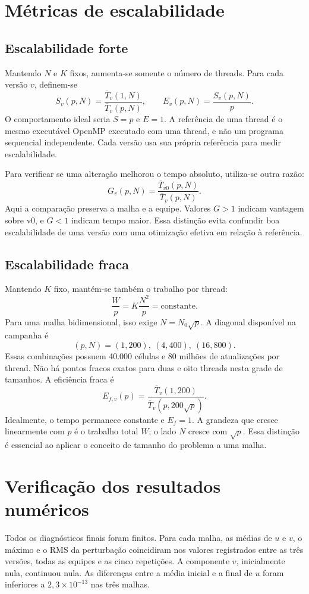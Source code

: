 \documentclass[12pt,a4paper]{article}
\begin{document}
\section{Métricas de escalabilidade}
\subsection{Escalabilidade forte}
Mantendo $N$ e $K$ fixos, aumenta-se somente o número de threads. Para cada versão $v$, definem-se
\begin{equation}
S_v(p,N)=\frac{\overline T_v(1,N)}{\overline T_v(p,N)},
\qquad
E_v(p,N)=\frac{S_v(p,N)}{p}.
\end{equation}
O comportamento ideal seria $S=p$ e $E=1$. A referência de uma thread é o mesmo executável OpenMP executado com uma thread, e não um programa sequencial independente. Cada versão usa sua própria referência para medir escalabilidade.

Para verificar se uma alteração melhorou o tempo absoluto, utiliza-se outra razão:
\[
G_v(p,N)=\frac{\overline T_{v0}(p,N)}{\overline T_v(p,N)}.
\]
Aqui a comparação preserva a malha e a equipe. Valores $G>1$ indicam vantagem sobre v0, e $G<1$ indicam tempo maior. Essa distinção evita confundir boa escalabilidade de uma versão com uma otimização efetiva em relação à referência.

\subsection{Escalabilidade fraca}
Mantendo $K$ fixo, mantém-se também o trabalho por thread:
\[
\frac{W}{p}=K\frac{N^2}{p}=\text{constante}.
\]
Para uma malha bidimensional, isso exige $N=N_0\sqrt p$. A diagonal disponível na campanha é
\[
(p,N)=(1,200),\ (4,400),\ (16,800).
\]
Essas combinações possuem 40.000 células e 80 milhões de atualizações por thread. Não há pontos fracos exatos para duas e oito threads nesta grade de tamanhos. A eficiência fraca é
\begin{equation}
E_{f,v}(p)=\frac{\overline T_v(1,200)}{\overline T_v(p,200\sqrt p)}.
\end{equation}
Idealmente, o tempo permanece constante e $E_f=1$. A grandeza que cresce linearmente com $p$ é o trabalho total $W$; o lado $N$ cresce com $\sqrt p$. Essa distinção é essencial ao aplicar o conceito de tamanho do problema a uma malha.



\section{Verificação dos resultados numéricos}
Todos os diagnósticos finais foram finitos. Para cada malha, as médias de $u$ e $v$, o máximo e o RMS da perturbação coincidiram nos valores registrados entre as três versões, todas as equipes e as cinco repetições. A componente $v$, inicialmente nula, continuou nula. As diferenças entre a média inicial e a final de $u$ foram inferiores a $2{,}3\times10^{-13}$ nas três malhas.
\end{document}
